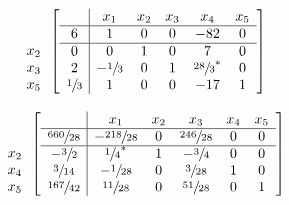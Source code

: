 \documentclass[12pt]{article}
\newenvironment{problem}[2][Problem]{\begin{trivlist}
\item[\hskip \labelsep {\bfseries #1}\hskip \labelsep {\bfseries #2.}]}{\end{trivlist}}
\theoremstyle{definition}
\begin{document}
\begin{problem}{4}
\begin{equation}
\begin{array}{c}
\\
  \\
x_2 \\
x_3 \\
x_5
\end{array}
\begin{bmatrix}
\begin{array}{c|ccccc}
    & x_1 & x_2 & x_3 & x_4 & x_5 \\ \hline
  6 & 1 & 0 & 0 & -82 & 0 \\ \hline
  0 & 0 & 1 & 0 & 7 & 0  \\
  2 & -\sfrac{1}{3} & 0 & 1 & \sfrac{28}{3}^* & 0  \\
  \sfrac{1}{3} & 1 & 0 & 0 & -17 & 1  \\
\end{array}
\end{bmatrix}
\end{equation}
$ $ \\

\begin{equation}
\begin{array}{c}
\\
  \\
x_2 \\
x_4 \\
x_5
\end{array}
\begin{bmatrix} %
\begin{array}{c|ccccc}
    & x_1 & x_2 & x_3 & x_4 & x_5 \\ \hline
  \sfrac{660}{28} & -\sfrac{218}{28} & 0 & \sfrac{246}{28} & 0 & 0 \\ \hline
  -\sfrac{3}{2} & \sfrac{1}{4}^* & 1 & -\sfrac{3}{4} & 0 & 0  \\
  \sfrac{3}{14} & -\sfrac{1}{28} & 0 & \sfrac{3}{28} & 1 & 0  \\
  \sfrac{167}{42} & \sfrac{11}{28} & 0 & \sfrac{51}{28} & 0 & 1  \\
\end{array}
\end{bmatrix}
\end{equation}
$ $ \\


\end{problem}
\end{document}

